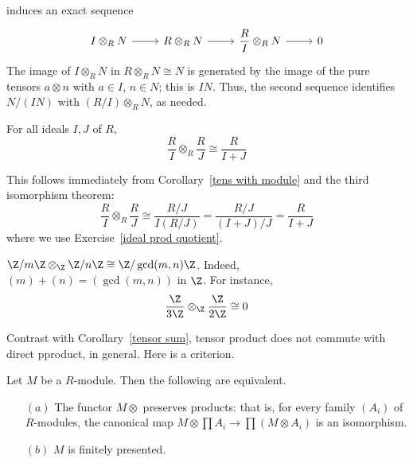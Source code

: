 induces an exact sequence
\[\begin{tikzcd}
I\otimes_{R}N\ar[r]&R\otimes_{R}N\ar[r]&\dfrac{R}{I}\otimes_{R}N\ar[r]&0
\end{tikzcd}\]
The image of $I\otimes_{R}N$ in $R\otimes_{R}N\cong N$ is generated by the image of the pure tensors $a\otimes n$ with $a\in I$, $n\in N$; this is $IN$. Thus, the second sequence identifies $N/(IN)$ with $(R/I)\otimes_{R}N$, as needed.
\begin{corollary}\label{tensor ideals}
For all ideals $I,J$ of $R$,
\[\dfrac{R}{I}\otimes_{R}\dfrac{R}{J}\cong \dfrac{R}{I+J}\]
\end{corollary}
This follows immediately from Corollary~\ref{tens with module} and the third isomorphism theorem:
\[\dfrac{R}{I}\otimes_{R}\dfrac{R}{J}\cong\dfrac{R/J}{I(R/J)}=\dfrac{R/J}{(I+J)/J}=\dfrac{R}{I+J}\]
where we use Exercise~\ref{ideal prod quotient}.
\begin{example}
$\Z/m\Z\otimes_{\Z}\Z/n\Z\cong\Z/\gcd(m,n)\Z$. Indeed, $(m)+(n)=(\gcd(m, n))$ in $\Z$. For instance,
\[\dfrac{\Z}{3\Z}\otimes_{\Z}\dfrac{\Z}{2\Z}\cong 0\]
\end{example}
Contrast with Corollary~\ref{tensor sum}, tensor product does not commute with direct pproduct, in general. Here is a criterion.
\begin{proposition}
Let $M$ be a $R$-module. Then the following are equivalent.
\begin{itemize}
\item[$(a)$]The functor $M\otimes$ preserves products: that is, for every family $(A_i)$ of $R$-modules, the canonical map $M\otimes\prod A_i\to\prod (M\otimes A_i)$ is an isomorphism.
\item[$(b)$]$M$ is finitely presented.
\end{itemize}
\end{proposition}
